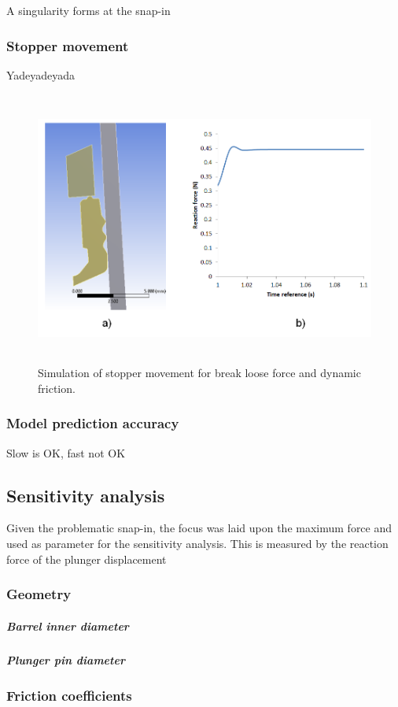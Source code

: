  A singularity forms at the snap-in
 
\newpage
\subsubsection{Stopper movement}
Yadeyadeyada

\begin{figure}[h!]	
	\centering
\includegraphics[height=9cm]{img/dyna.png}
   \caption{Simulation of stopper movement for break loose force and dynamic friction.}
 \label{fgr:PFS}
\end{figure}


\subsubsection{Model prediction accuracy}
Slow is OK, fast not OK


\newpage
\subsection{Sensitivity analysis}
Given the problematic snap-in, the focus was laid upon the maximum force and used as parameter for the sensitivity analysis. This is measured by the reaction force of the plunger displacement
\subsubsection{Geometry}
\subparagraph*{Barrel inner diameter}
\subparagraph*{Plunger pin diameter}
\subsubsection{Friction coefficients}

